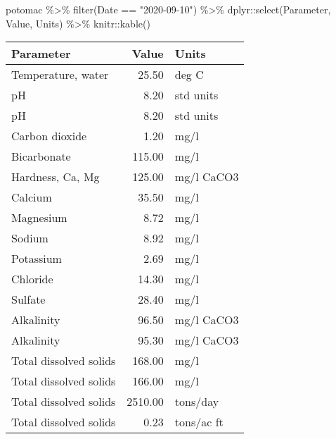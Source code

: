 \documentclass[
]{article}
\newenvironment{Shaded}{\begin{snugshade}}{\end{snugshade}}
\newcommand{\FunctionTok}[1]{\textcolor[rgb]{0.00,0.00,0.00}{#1}}
\newcommand{\NormalTok}[1]{#1}
\newcommand{\SpecialCharTok}[1]{\textcolor[rgb]{0.00,0.00,0.00}{#1}}
\newcommand{\StringTok}[1]{\textcolor[rgb]{0.31,0.60,0.02}{#1}}
\begin{document}
\begin{Shaded}
\begin{Highlighting}[]
\NormalTok{potomac }\SpecialCharTok{\%\textgreater{}\%} 
  \FunctionTok{filter}\NormalTok{(Date }\SpecialCharTok{==} \StringTok{"2020{-}09{-}10"}\NormalTok{) }\SpecialCharTok{\%\textgreater{}\%} 
\NormalTok{  dplyr}\SpecialCharTok{::}\FunctionTok{select}\NormalTok{(Parameter, Value, Units) }\SpecialCharTok{\%\textgreater{}\%} 
\NormalTok{  knitr}\SpecialCharTok{::}\FunctionTok{kable}\NormalTok{()}
\end{Highlighting}
\end{Shaded}

\begin{longtable}[]{@{}lrl@{}}
\toprule
Parameter & Value & Units\tabularnewline
\midrule
\endhead
Temperature, water & 25.50 & deg C\tabularnewline
pH & 8.20 & std units\tabularnewline
pH & 8.20 & std units\tabularnewline
Carbon dioxide & 1.20 & mg/l\tabularnewline
Bicarbonate & 115.00 & mg/l\tabularnewline
Hardness, Ca, Mg & 125.00 & mg/l CaCO3\tabularnewline
Calcium & 35.50 & mg/l\tabularnewline
Magnesium & 8.72 & mg/l\tabularnewline
Sodium & 8.92 & mg/l\tabularnewline
Potassium & 2.69 & mg/l\tabularnewline
Chloride & 14.30 & mg/l\tabularnewline
Sulfate & 28.40 & mg/l\tabularnewline
Alkalinity & 96.50 & mg/l CaCO3\tabularnewline
Alkalinity & 95.30 & mg/l CaCO3\tabularnewline
Total dissolved solids & 168.00 & mg/l\tabularnewline
Total dissolved solids & 166.00 & mg/l\tabularnewline
Total dissolved solids & 2510.00 & tons/day\tabularnewline
Total dissolved solids & 0.23 & tons/ac ft\tabularnewline
\bottomrule
\end{longtable}
\end{document}
